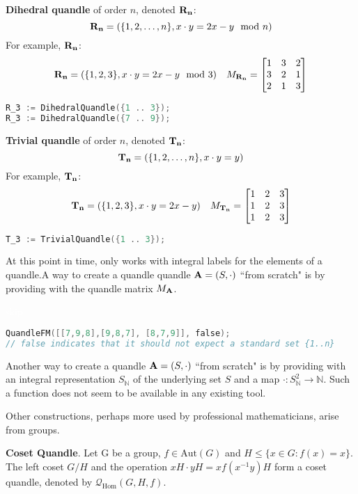 \documentclass{../mcom-l}
\begin{document}
\begin{example}\cite{lopes2006finite}
\textbf{Dihedral quandle} of order $n$, denoted $\mathbf{R_n}$:
\[\mathbf{R_n} = (\{1,2,\dots,n\}, x \cdot y = 2x-y\mod{n})\]
For example, $\mathbf{R_n}$:
\[\mathbf{R_n} = (\{1,2,3\}, x \cdot y = 2x-y\mod{3}) \quad M_\mathbf{R_n}=\begin{bmatrix}
 1 & 3 & 2\\
 3 & 2 & 1\\
 2 & 1 & 3
\end{bmatrix}\]
\begin{lstlisting}[language=C]
R_3 := DihedralQuandle({1 .. 3});
R_3 := DihedralQuandle({7 .. 9});
\end{lstlisting}
\end{example}

\begin{example}\cite{lopes2006finite}
\textbf{Trivial quandle} of order $n$, denoted $\mathbf{T_n}$:
\[\mathbf{T_n} = (\{1,2,\dots,n\}, x \cdot y = y)\]
For example, $\mathbf{T_n}$:
\[\mathbf{T_n} = (\{1,2,3\}, x \cdot y = 2x-y) \quad M_\mathbf{T_n}=\begin{bmatrix}
 1 & 2 & 3\\
 1 & 2 & 3\\
 1 & 2 & 3
\end{bmatrix}\]
\begin{lstlisting}[language=C]
T_3 := TrivialQuandle({1 .. 3});
\end{lstlisting}
\end{example}
At this point in time, \Software only works with integral labels for the elements of a quandle.\newline A way to create a quandle quandle $\mathbf{A}=(S,\cdot)$ ``from scratch" is by providing \Software with
the quandle matrix $M_\mathbf{A}$.
\begin{example}\textcolor{white}{skip}\newline
\begin{lstlisting}[language=C]
QuandleFM([[7,9,8],[9,8,7], [8,7,9]], false); 
// false indicates that it should not expect a standard set {1..n}
\end{lstlisting}
\end{example}
Another way to create a quandle $\mathbf{A}=(S,\cdot)$ ``from scratch" is by providing \Software with an integral representation $S_\mathbb{N}$ of the underlying set $S$ and a map $\cdot : S_{\mathbb{N}}^2 \to \mathbb{N}$. Such a function does not seem to be available in any existing tool. 


Other constructions, perhaps more used by professional mathematicians, arise from groups. 

\begin{example}
\cite{bianco2021connected}
\textbf{Coset Quandle}. Let G be a group, $f \in \text{Aut}(G)$ and \linebreak $H \leq \{x \in G : f(x) = x\}$.\newline
The left coset $G/H$ and the operation $xH \cdot yH = xf(x^{-1}y)H$ form a coset quandle, denoted by  $\mathcal{Q}_{\text{Hom}}(G,H,f)$.
\end{example}
\end{document}
